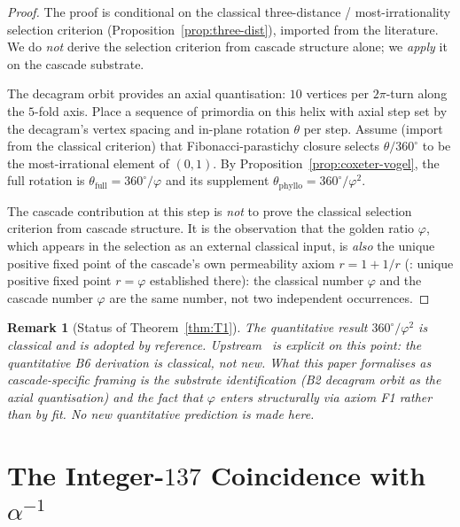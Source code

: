 \documentclass[12pt]{article}
\newtheorem{remark}[theorem]{Remark}
\newcommand{\phig}{\varphi}
\begin{document}
\begin{proof}
The proof is conditional on the classical three-distance /
most-irrationality selection criterion
(Proposition~\ref{prop:three-dist}), imported from the literature.
We do \emph{not} derive the selection criterion from cascade
structure alone; we \emph{apply} it on the cascade substrate.

The decagram orbit provides an axial quantisation: $10$ vertices
per $2\pi$-turn along the $5$-fold axis. Place a sequence of
primordia on this helix with axial step set by the decagram's
vertex spacing and in-plane rotation $\theta$ per step. Assume
(import from the classical criterion) that Fibonacci-parastichy
closure selects $\theta/360^{\circ}$ to be the most-irrational
element of $(0, 1)$. By Proposition~\ref{prop:coxeter-vogel}, the
full rotation is $\theta_{\mathrm{full}} = 360^{\circ}/\phig$ and
its supplement $\theta_{\mathrm{phyllo}} = 360^{\circ}/\phig^2$.

The cascade contribution at this step is \emph{not} to prove the
classical selection criterion from cascade structure. It is the
observation that the golden ratio $\phig$, which appears in the
selection as an external classical input, is \emph{also} the
unique positive fixed point of the cascade's own permeability
axiom $r = 1 + 1/r$
(\cite[\S F1]{CascadeFoundations}: unique positive fixed point
$r = \phig$ established there): the
classical number $\phig$ and the cascade number $\phig$ are the
same number, not two independent occurrences.
\end{proof}

\begin{remark}[Status of Theorem~\ref{thm:T1}]
The quantitative result $360^{\circ}/\phig^2$ is classical
\cite{Coxeter1953,Vogel1979} and is adopted by reference.
Upstream~\cite[\S B6]{CascadeBio} is explicit on this point: the
quantitative B6 derivation is classical, not new. What this
paper formalises as \emph{cascade-specific framing} is the
substrate identification (B2 decagram orbit as the axial
quantisation) and the fact that $\phig$ enters structurally via
axiom F1 rather than by fit. No new quantitative prediction is
made here.
\end{remark}

\section{The Integer-$137$ Coincidence with $\alpha^{-1}$}\label{sec:alpha}
\end{document}
